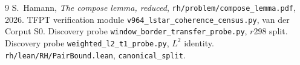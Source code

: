 \documentclass[11pt]{article}
\theoremstyle{remark}
\begin{document}
\begin{thebibliography}{9}
 S.~Hamann,
\textit{The compose lemma, reduced},
\texttt{rh/problem/compose\_lemma.pdf}, 2026.
 TFPT verification module
\texttt{v964\_lstar\_coherence\_census.py}, van der Corput S0.
 Discovery probe
\texttt{window\_border\_transfer\_probe.py}, $r298$ split.
 Discovery probe
\texttt{weighted\_l2\_t1\_probe.py}, $L^2$ identity.
 \texttt{rh/lean/RH/PairBound.lean},
\texttt{canonical\_split}.
\end{thebibliography}
\end{document}
